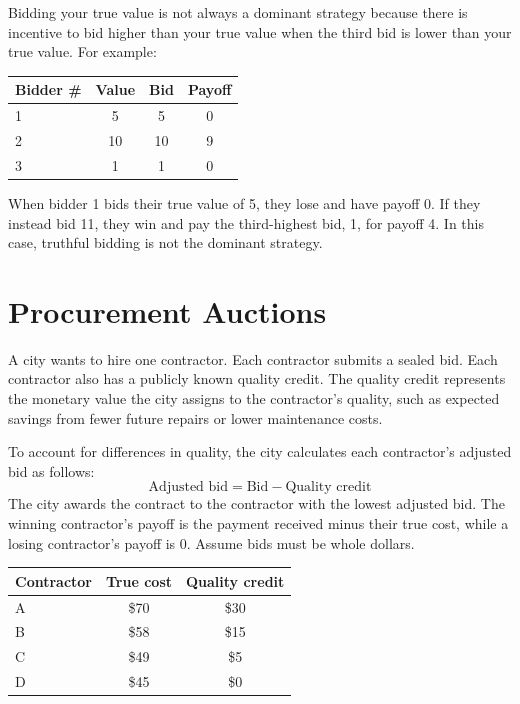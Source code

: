 \documentclass[newpages, arabicsubsec]{assignment}
\begin{document}
\begin{solution}
    Bidding your true value is not always a dominant strategy because there is incentive to bid higher than your true value when the third bid is lower than your true value. For example:

    \begin{table}[h]
        \centering
        \begin{tabular}{lccc}
            \toprule
            Bidder \# & Value & Bid & Payoff \\
            \midrule
            1         & 5     & 5   & 0      \\
            2         & 10    & 10  & 9      \\
            3         & 1     & 1   & 0      \\
            \bottomrule
        \end{tabular}
    \end{table}

    When bidder 1 bids their true value of 5, they lose and have payoff 0. If they instead bid 11, they win and pay the third-highest bid, 1, for payoff 4. In this case, truthful bidding is not the dominant strategy.
\end{solution}

\section{Procurement Auctions}

\begin{problem}
A city wants to hire one contractor. Each contractor submits a sealed bid. Each contractor also has a publicly known quality credit. The quality credit represents the monetary value the city assigns to the contractor's quality, such as expected savings from fewer future repairs or lower maintenance costs.

To account for differences in quality, the city calculates each contractor's adjusted bid as follows:
\[
    \text{Adjusted bid} = \text{Bid} - \text{Quality credit}
\]
The city awards the contract to the contractor with the lowest adjusted bid. The winning contractor's payoff is the payment received minus their true cost, while a losing contractor's payoff is 0. Assume bids must be whole dollars.

\begin{table}[h!]
    \centering
    \begin{tabular}{lcc}
        \hline
        Contractor & True cost & Quality credit \\
        \hline
        A          & \$70      & \$30           \\
        B          & \$58      & \$15           \\
        C          & \$49      & \$5            \\
        D          & \$45      & \$0            \\
        \hline
    \end{tabular}
\end{table}
\end{problem}
\end{document}
